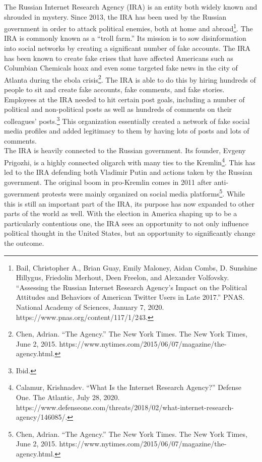 \documentclass[10pt, letterpaper]{article}
\begin{document}
The Russian Internet Research Agency (IRA) is an entity both widely
known and shrouded in mystery. Since 2013, the IRA has been used by the
Russian government in order to attack political enemies, both at home
and abroad\footnote{Bail, Christopher A., Brian Guay, Emily Maloney,
  Aidan Combs, D. Sunshine Hillygus, Friedolin Merhout, Deen Freelon,
  and Alexander Volfovsky. ``Assessing the Russian Internet Research
  Agency's Impact on the Political Attitudes and Behaviors of American
  Twitter Users in Late 2017.'' PNAS. National Academy of Sciences,
  January 7, 2020. https://www.pnas.org/content/117/1/243.}. The IRA is
commonly known as a ``troll farm.'' Its mission is to sow disinformation
into social networks by creating a significant number of fake accounts.
The IRA has been known to create fake crises that have affected
Americans such as Columbian Chemicals hoax and even some targeted fake
news in the city of Atlanta during the ebola crisis\footnote{Chen,
  Adrian. ``The Agency.'' The New York Times. The New York Times, June
  2, 2015. https://www.nytimes.com/2015/06/07/magazine/the-agency.html.}.
The IRA is able to do this by hiring hundreds of people to sit and
create fake accounts, fake comments, and fake stories. Employees at the
IRA needed to hit certain post goals, including a number of political
and non-political posts as well as hundreds of comments on their
colleagues' posts.\footnote{Ibid.} This organization essentially created
a network of fake social media profiles and added legitimacy to them by
having lots of posts and lots of comments. \\

The IRA is heavily connected to the Russian government. Its founder,
Evgeny Prigozhi, is a highly connected oligarch with many ties to the
Kremlin\footnote{Calamur, Krishnadev. ``What Is the Internet Research
  Agency?'' Defense One. The Atlantic, July 28, 2020.
  https://www.defenseone.com/threats/2018/02/what-internet-research-agency/146085/.}.
This has led to the IRA defending both Vladimir Putin and actions taken
by the Russian government. The original boom in pro-Kremlin comes in
2011 after anti-government protests were mainly organized on social
media platforms\footnote{Chen, Adrian. ``The Agency.'' The New York
  Times. The New York Times, June 2, 2015.
  https://www.nytimes.com/2015/06/07/magazine/the-agency.html.}. While
this is still an important part of the IRA, its purpose has now expanded
to other parts of the world as well. With the election in America
shaping up to be a particularly contentious one, the IRA sees an
opportunity to not only influence political thought in the United
States, but an opportunity to significantly change the outcome. \\
\end{document}
